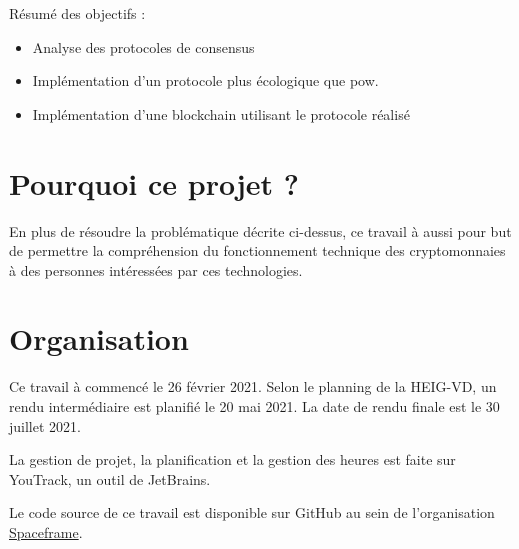\documentclass[../tb_report.tex]{subfiles}
\begin{document}
Résumé des objectifs :
\begin{itemize}
    \item Analyse des protocoles de consensus
    \item Implémentation d'un protocole plus écologique que \gls{pow}.
    \item Implémentation d'une blockchain utilisant le protocole réalisé
\end{itemize}

\section{Pourquoi ce projet ?}

En plus de résoudre la problématique décrite ci-dessus, ce travail à aussi pour but de permettre la compréhension du fonctionnement technique des cryptomonnaies à des personnes intéressées par ces technologies.

\section{Organisation}

Ce travail à commencé le 26 février 2021.
Selon le planning de la HEIG-VD, un rendu intermédiaire est planifié le 20 mai 2021. La date de rendu finale est le 30 juillet 2021.

La gestion de projet, la planification et la gestion des heures est faite sur YouTrack, un outil de JetBrains.

Le code source de ce travail est disponible sur GitHub au sein de l'organisation \href{https://github.com/spaceframeos}{Spaceframe}.
\end{document}
